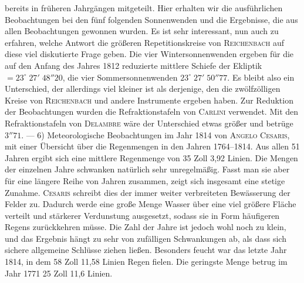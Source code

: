 bereits in früheren Jahrgängen mitgeteilt. Hier erhalten wir die ausführlichen Beobachtungen bei den fünf folgenden Sonnenwenden und die Ergebnisse, die aus allen Beobachtungen gewonnen wurden. Es ist sehr interessant, nun auch zu erfahren, welche Antwort die größeren Repetitionskreise von \textsc{Reichenbach} auf diese viel diskutierte Frage geben. Die vier Wintersonnenwenden ergeben für die auf den Anfang des Jahres 1812 reduzierte mittlere Schiefe der Ekliptik $=23^\circ\;27'\;48''20$, die vier Sommersonnenwenden $23^\circ\;27'\;50''77$. Es bleibt also ein Unterschied, der allerdings viel kleiner ist als derjenige, den die zwölfzölligen Kreise von \textsc{Reichenbach} und andere Instrumente ergeben haben. Zur Reduktion der Beobachtungen wurden die Refraktionstafeln von \textsc{Carlini} verwendet. Mit den Refraktionstafeln von \textsc{Delambre} wäre der Unterschied etwas größer und betrüge $3''71$. --- 6) Meteorologische Beobachtungen im Jahr 1814 von \textsc{Angelo Cesaris}, mit einer Übersicht über die Regenmengen in den Jahren 1764--1814. Aus allen 51 Jahren ergibt sich eine mittlere Regenmenge von 35 Zoll 3,92 Linien. Die Mengen der einzelnen Jahre schwanken natürlich sehr unregelmäßig. Fasst man sie aber für eine längere Reihe von Jahren zusammen, zeigt sich insgesamt eine stetige Zunahme. \textsc{Cesaris} schreibt dies der immer weiter verbreiteten Bewässerung der Felder zu. Dadurch werde eine große Menge Wasser über eine viel größere Fläche verteilt und stärkerer Verdunstung ausgesetzt, sodass sie in Form häufigeren Regens zurückkehren müsse. Die Zahl der Jahre ist jedoch wohl noch zu klein, und das Ergebnis hängt zu sehr von zufälligen Schwankungen ab, als dass sich \mbox{sichere} allgemeine Schlüsse ziehen ließen. Besonders feucht war das letzte Jahr 1814, in dem 58 Zoll 11,58 Linien Regen fielen. Die geringste Menge betrug im Jahr 1771 25 Zoll 11,6 Linien.
